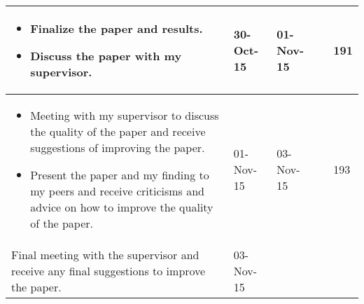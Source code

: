 \begin{longtable}{|>{\raggedleft\arraybackslash}m{50mm}|m{10mm}|m{10mm}|m{10mm}|m{30mm}|}
			\hline
				\begin{itemize}  
					\item Finalize the paper and results.
					\item Discuss the paper with my supervisor.
                \end{itemize} & 30-Oct-15  & 01-Nov-15 &                & 191\\
			\hline
			
			\hline
				\begin{itemize}  
					\item Meeting with my supervisor to discuss the quality of the paper and receive suggestions of improving the paper.
					\item Present the paper and my finding to my peers and receive criticisms and advice on how to improve the quality of the paper.
				 \end{itemize} & 01-Nov-15  & 03-Nov-15 &                & 193 \\
			\hline  
			
			
			\hline
				Final meeting with the supervisor and receive any final suggestions to improve the paper. & 03-Nov-15 & & &\\
			\hline
\hline
\end{longtable}
 
